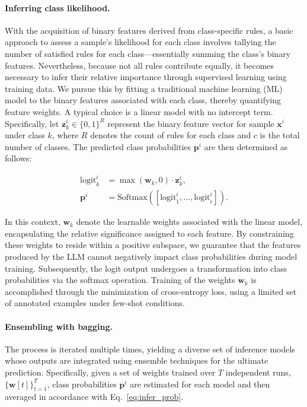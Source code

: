 \paragraph{Inferring class likelihood.} With the acquisition of binary features derived from class-specific rules, a basic approach to assess a sample’s likelihood for each class involves tallying the number of satisfied rules for each class—essentially summing the class's binary features. Nevertheless, because not all rules contribute equally, it becomes necessary to infer their relative importance through supervised learning using training data. We pursue this by fitting a traditional machine learning (ML) model to the binary features associated with each class, thereby quantifying feature weights. A typical choice is a linear model with no intercept term. Specifically, let $\mathbf{z}_k^i \in \{0, 1\}^R$ represent the binary feature vector for sample $\mathbf{x}^i$ under class $k$, where $R$ denotes the count of rules for each class and $c$ is the total number of classes. The predicted class probabilities $\mathbf{p}^i$ are then determined as follows:

\begin{align}
\text{logit}_k^i &= \max(\mathbf{w}_k, 0) \cdot \mathbf{z}_k^i, \nonumber \\
\mathbf{p}^i &= \text{Softmax}({[\text{logit}_{1}^i, ..., \text{logit}_{c}^i]}). \label{eq:infer_prob}
\end{align}

In this context, $\mathbf{w}_k$ denote the learnable weights associated with the linear model, encapsulating the relative significance assigned to each feature. By constraining these weights to reside within a positive subspace, we guarantee that the features produced by the LLM cannot negatively impact class probabilities during model training. Subsequently, the logit output undergoes a transformation into class probabilities via the softmax operation. Training of the weights $\mathbf{w}_k$ is accomplished through the minimization of cross-entropy loss, using a limited set of annotated examples under few-shot conditions.

\vspace*{-0.12in}
\paragraph{Ensembling with bagging.} The process is iterated multiple times, yielding a diverse set of inference models whose outputs are integrated using ensemble techniques for the ultimate prediction. Specifically, given a set of weights trained over $T$ independent runs, $\{\mathbf{w}[t]\}_{t=1}^T$, class probabilities $\mathbf{p}^i$ are estimated for each model and then averaged in accordance with Eq.~\ref{eq:infer_prob}.

